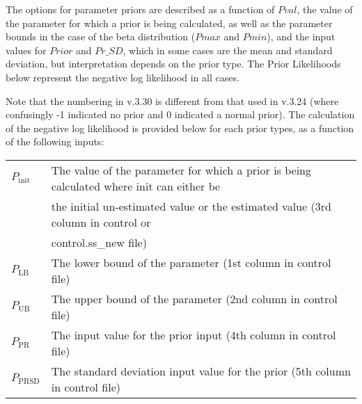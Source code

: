 The options for parameter priors are described as a function of $Pval$, the value of the parameter for which a prior is being calculated, as well as the parameter bounds in the case of the beta distribution ($Pmax$ and $Pmin$), and the input values for $Prior$ and $Pr\_SD$, which in some cases are the mean and standard deviation, but interpretation depends on the prior type. The Prior Likelihoods below represent the negative log likelihood in all cases.

Note that the numbering in v.3.30 is different from that used in v.3.24 (where confusingly -1 indicated no prior and 0 indicated a normal prior). The calculation of the negative log likelihood is provided below for each prior types, as a function of the following inputs:

\begin{tabular}{ll}
	$P_\text{init}$ & The value of the parameter for which a prior is being calculated where init can either be \\
	                & the initial un-estimated value or the estimated value (3rd column in control or \\
	                & control.ss\_new file)       \\
	$P_\text{LB}$   & The lower bound of the parameter (1st column in control file)     \\
	$P_\text{UB}$   & The upper bound of the parameter (2nd column in control file)     \\
	$P_\text{PR}$   & The input value for the prior input (4th column in control file)  \\
	$P_\text{PRSD}$ & The standard deviation input value for the prior (5th column in control file) \\
\end{tabular}

